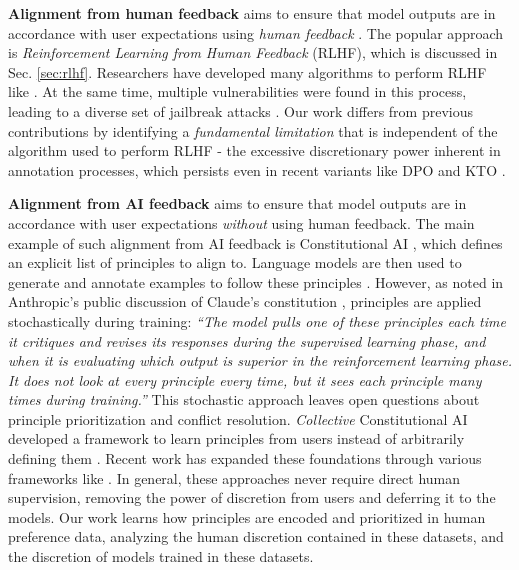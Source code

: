 \documentclass{article}
\begin{document}
\noindent \textbf{Alignment from human feedback} aims to ensure that model outputs are in accordance with user expectations using \emph{human feedback} \cite{christiano2017deep}. The popular approach is \emph{Reinforcement Learning from Human Feedback} (RLHF), which is discussed in Sec. \ref{sec:rlhf}. Researchers have developed many algorithms to perform RLHF like \cite{ziegler2019fine,ouyang2022training}. At the same time, multiple vulnerabilities were found in this process, leading to a diverse set of jailbreak attacks \cite{perez2022red}. Our work differs from previous contributions by identifying a \emph{fundamental limitation} that is independent of the algorithm used to perform RLHF - the excessive discretionary power inherent in annotation processes, which persists even in recent variants like DPO \cite{rafailov2024direct} and KTO \cite{ethayarajh2024kto}.

\noindent \textbf{Alignment from AI feedback}
 aims to ensure that model outputs are in accordance with user expectations \emph{without} using human feedback. The main example of such alignment from AI feedback is Constitutional AI \cite{bai2022constitutional}, which defines an explicit list of principles to align to. Language models are then used to generate and annotate examples to follow these principles  \cite{bai2022constitutional}. However, as noted in Anthropic's public discussion of Claude's constitution \cite{anthropic2024claude}, principles are applied stochastically during training: \emph{``The model pulls one of these principles each time it critiques and revises its responses during the supervised learning phase, and when it is evaluating which output is superior in the reinforcement learning phase. It does not look at every principle every time, but it sees each principle many times during training.''} This stochastic approach leaves open questions about principle prioritization and conflict resolution.
\textit{Collective} Constitutional AI developed a framework to learn principles from users instead of arbitrarily defining them \cite{huang2024collective}.
Recent work has expanded these foundations through various frameworks like \cite{mu2024rule, dong2023steerlmattributeconditionedsft}. In general, these approaches never require direct human supervision, removing the power of discretion from users and deferring it to the models.
Our work learns how principles are encoded and prioritized in human preference data, analyzing the human discretion contained in these datasets, and the discretion of models trained in these datasets.
\end{document}
